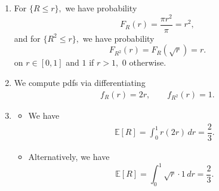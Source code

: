 \documentclass[12pt]{article}
\begin{document}
\begin{enumerate}
\begin{enumerate}
      \item For $\{R \leq r\},$ we have probability
        $$
        F_R(r) = \dfrac{\pi r^2}{\pi} = r^2,
        $$
        and for $\{R^2 \leq r\},$ we have probability $$
        F_{R^2}(r) = F_{R}(\sqrt{r}) = r.
        $$
        on $r \in [0, 1]$ and $1$ if $r > 1,$ $0$ otherwise.

      \item We compute pdfs via differentiating
        \begin{align*}
          f_R(r) = 2r, \qquad f_{R^2}(r) = 1.
        \end{align*}

      \item
        \begin{itemize}
          \item We have
            \begin{align*}
              \mathbb E[R] = \int_{0}^{1} r (2r) \, dr = \dfrac{2}{3}.
            \end{align*}

          \item Alternatively, we have
            $$
            \mathbb E[R] = \int_{0}^{1} \sqrt{r} \cdot 1 \, dr = \dfrac{2}{3}.
            $$
        \end{itemize}
    \end{enumerate}
\end{enumerate}
\end{document}

